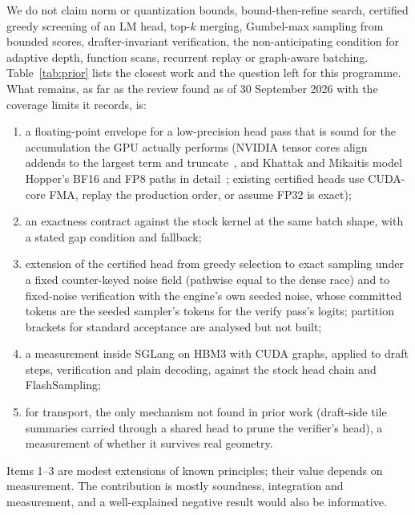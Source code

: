 We do not claim norm or quantization bounds, bound-then-refine search, certified greedy screening of an LM head, top-$k$ merging, Gumbel-max sampling from bounded scores, drafter-invariant verification, the non-anticipating condition for adaptive depth, function scans, recurrent replay or graph-aware batching. Table~\ref{tab:prior} lists the closest work and the question left for this programme. What remains, as far as the review found as of 30 September 2026 with the coverage limits it records, is:
\begin{enumerate}
\item a floating-point envelope for a low-precision head pass that is sound for the accumulation the GPU actually performs (NVIDIA tensor cores align addends to the largest term and truncate~\cite{fasi2021}, and Khattak and Mikaitis model Hopper's BF16 and FP8 paths in detail~\cite{khattak2026}; existing certified heads use CUDA-core FMA, replay the production order, or assume FP32 is exact);
\item an exactness contract against the stock kernel at the same batch shape, with a stated gap condition and fallback;
\item extension of the certified head from greedy selection to exact sampling under a fixed counter-keyed noise field (pathwise equal to the dense race) and to fixed-noise verification with the engine's own seeded noise, whose committed tokens are the seeded sampler's tokens for the verify pass's logits; partition brackets for standard acceptance are analysed but not built;
\item a measurement inside SGLang on HBM3 with CUDA graphs, applied to draft steps, verification and plain decoding, against the stock head chain and FlashSampling;
\item for transport, the only mechanism not found in prior work (draft-side tile summaries carried through a shared head to prune the verifier's head), a measurement of whether it survives real geometry.
\end{enumerate}
Items 1--3 are modest extensions of known principles; their value depends on measurement. The contribution is mostly soundness, integration and measurement, and a well-explained negative result would also be informative.

